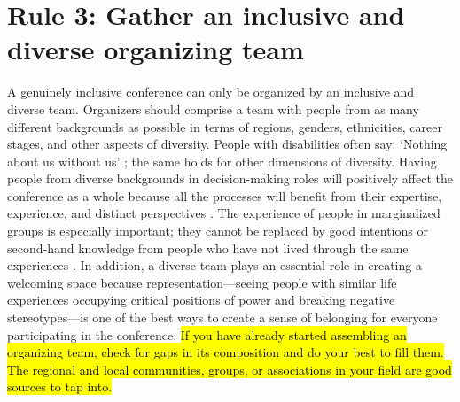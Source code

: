 \documentclass[10pt,letterpaper]{article}
\begin{document}
\section*{Rule 3: Gather an inclusive and diverse organizing team}
\label{rule_organizing_team}

A genuinely inclusive conference can only be organized by an inclusive and diverse team.
Organizers should comprise a team with people from as many different backgrounds as possible in terms of regions, genders, ethnicities, career stages, and other aspects of diversity.
People with disabilities often say: `Nothing about us without us' \cite{charlton_nothing_1998, werner_nothing_1998}; the same holds for other dimensions of diversity. 
Having people from diverse backgrounds in decision-making roles will positively affect the conference as a whole because all the processes will benefit from their expertise, experience, and distinct perspectives \cite{hongGroupsDiverseProblem2004}. 
The experience of people in marginalized groups
is especially important; they cannot be replaced by good intentions or second-hand knowledge from people who have not lived through the same experiences \cite{costanzachockDesign2020}.
In addition, a diverse team plays an essential role in creating a welcoming space because representation—seeing people with similar life experiences occupying critical positions of power and breaking negative stereotypes—is one of the best ways to create a sense of belonging for everyone participating in the conference.
\hl{If you have already started assembling an organizing team, check for gaps in its composition and do your best to fill them. 
The regional and local communities, groups, or associations in your field are good sources to tap into.}
\end{document}
